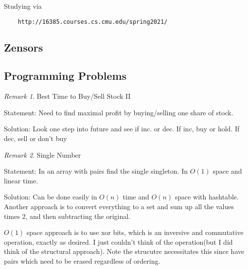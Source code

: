 \documentclass[11pt]{article}
\theoremstyle{remark}
\newtheorem{remark}{Remark}
\begin{document}
Studying via

\begin{verbatim}
	http://16385.courses.cs.cmu.edu/spring2021/
\end{verbatim}

\subsection{Zensors}

\subsection{Programming Problems}

\begin{remark}
	Best Time to Buy/Sell Stock II
\end{remark}

Statement: Need to find maximal profit by buying/selling one share of stock. 

Solution: Look one step into future and see if inc. or dec. If inc, buy or hold. If dec, sell or don't buy

\begin{remark}
	Single Number
\end{remark}

Statement: In an array with pairs find the single singleton. In $O(1)$ space and linear time.

Solution: Can be done easily in $O(n)$ time and $O(n)$ space with hashtable. Another approach is to convert everything to a set and sum up all the values times 2, and then subtracting the original.

$O(1)$ space approach is to use xor bits, which is an inversive and commutative operation, exactly as desired. I just couldn't think of the operation(but I did think of the structural approach). Note the strucutre necessitates this since have pairs which need to be erased regardless of ordering.
\end{document}
